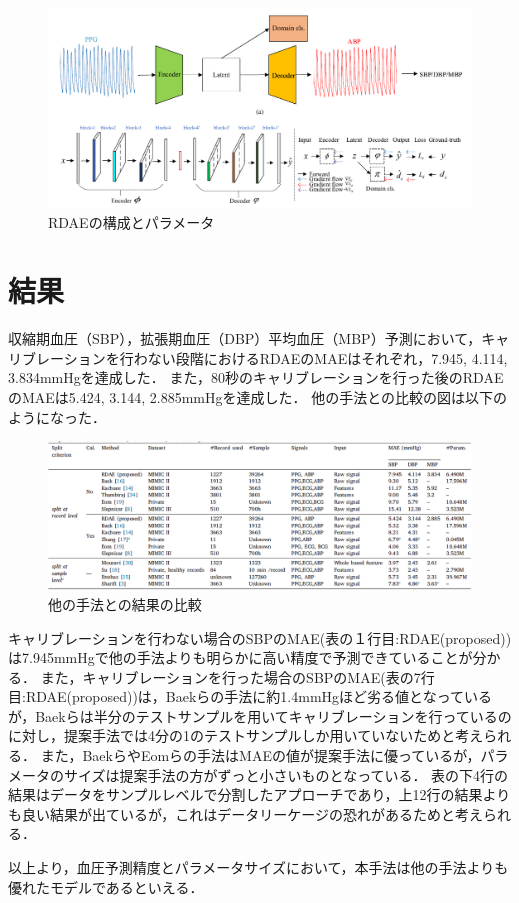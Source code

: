 \documentclass[dvipdfmx]{jsarticle}
\begin{document}
\begin{figure}[htbp]
\begin{center}
\includegraphics[width=\linewidth]{./rdae_model.png}
\end{center}
\caption{RDAEの構成とパラメータ}
\end{figure}
\section{結果}
収縮期血圧（SBP），拡張期血圧（DBP）平均血圧（MBP）予測において，キャリブレーションを行わない段階におけるRDAEのMAEはそれぞれ，7.945, 4.114, 3.834mmHgを達成した．
また，80秒のキャリブレーションを行った後のRDAEのMAEは5.424, 3.144, 2.885mmHgを達成した．
他の手法との比較の図は以下のようになった．
\begin{figure}[htbp]
\begin{center}
\includegraphics[width=\linewidth]{./result_comparison_with_other_system.png}
\end{center}
\caption{他の手法との結果の比較}
\end{figure}

キャリブレーションを行わない場合のSBPのMAE(表の１行目:RDAE(proposed))は7.945mmHgで他の手法よりも明らかに高い精度で予測できていることが分かる．
また，キャリブレーションを行った場合のSBPのMAE(表の7行目:RDAE(proposed))は，Baekらの手法に約1.4mmHgほど劣る値となっているが，Baekらは半分のテストサンプルを用いてキャリブレーションを行っているのに対し，提案手法では4分の1のテストサンプルしか用いていないためと考えられる．
また，BaekらやEomらの手法はMAEの値が提案手法に優っているが，パラメータのサイズは提案手法の方がずっと小さいものとなっている．
表の下4行の結果はデータをサンプルレベルで分割したアプローチであり，上12行の結果よりも良い結果が出ているが，これはデータリーケージの恐れがあるためと考えられる．

以上より，血圧予測精度とパラメータサイズにおいて，本手法は他の手法よりも優れたモデルであるといえる．

\begin{thebibliography}{}
\item
\end{thebibliography}
\end{document}
